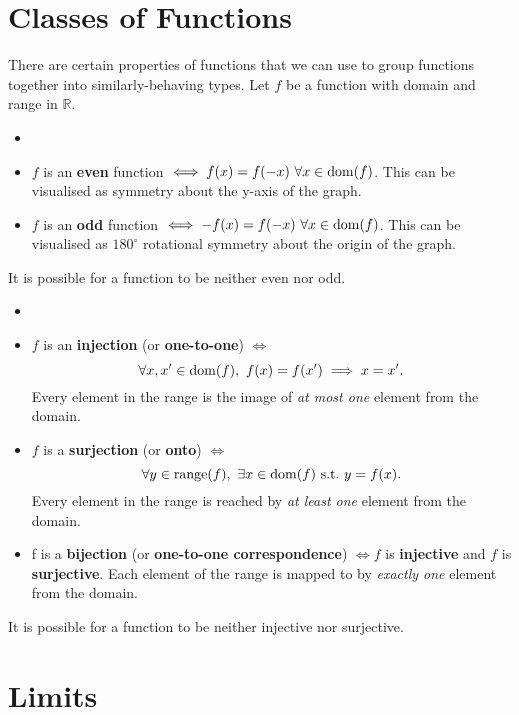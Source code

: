 \documentclass[../real_analysis.tex]{subfiles}
\begin{document}
    \section{Classes of Functions}\label{sec:classes-of-functions}
        There are certain properties of functions that we can use to group functions together into similarly-behaving types. Let $f$ be a function with domain and range in $\mathbb{R}$.
        \begin{definition}
            \begin{itemize} \item[]
                \item $f$ is an \textbf{even} function $\iff f(x) = f(-x)\ \forall x \in \operatorname{dom}(f)$. This can be visualised as symmetry about the y-axis of the graph.
                \item $f$ is an \textbf{odd} function $\iff -f(x) = f(-x)\ \forall x \in \operatorname{dom}(f)$. This can be visualised as $180^\circ$ rotational symmetry about the origin of the graph.
            \end{itemize}
            It is possible for a function to be neither even nor odd.
        \end{definition}
        \begin{definition}
            \begin{itemize} \item[]
                \item $f$ is an \textbf{injection} (or \textbf{one-to-one}) $\iff$
                \[\forall x, x^\prime \in \operatorname{dom}(f),\ {f(x) = f(x^\prime) \implies x = x^\prime}.\] Every element in the range is the image of \textit{at most one} element from the domain.
                \item $f$ is a \textbf{surjection} (or \textbf{onto}) $\iff$
                \[\forall y \in \operatorname{range}(f),\ \exists x \in \operatorname{dom}(f)\  \text{s.t.}\ y = f(x).\]
                Every element in the range is reached by \textit{at least one} element from the domain.
                \item f is a \textbf{bijection} (or \textbf{one-to-one correspondence}) $\iff f$ is \textbf{injective} and $f$ is \textbf{surjective}. Each element of the range is mapped to by \textit{exactly one} element from the domain.
            \end{itemize}
            It is possible for a function to be neither  injective nor surjective.
        \end{definition}

    \section{Limits}\label{sec:limits}
\end{document}
